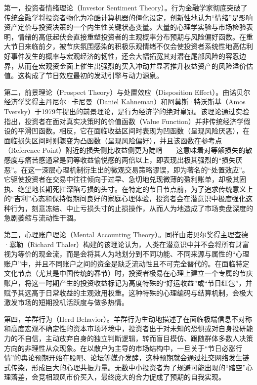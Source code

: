 \documentclass{cupb-thesis}
\begin{document}
第一，投资者情绪理论（Investor Sentiment Theory）。行为金融学家彻底突破了传统金融学将投资者物化为冷酷计算机器的僵化设定，创新性地认为“情绪”是影响资产定价与投资决策的一个内生性关键状态变量。大量的心理学实验与市场检验表明，情绪的高低起伏会直接重塑投资者的主观概率分布预期与风险偏好函数。在重大节日来临前夕，被节庆氛围感染的积极乐观情绪不仅会使投资者系统性地高估利好事件发生的概率与宏观经济的韧性，还会大幅拓宽其对潜在尾部风险的容忍边界，从而在宏观资金面上催生出强烈的买入冲动并显著推升权益资产的风险溢价估值。这构成了节日效应最初的发动引擎与动力源泉。


第二，前景理论（Prospect Theory）与处置效应（Disposition Effect）。由诺贝尔经济学奖得主丹尼尔·卡尼曼（Daniel Kahneman）和阿莫斯·特沃斯基（Amos Tversky）于1979年提出的前景理论，是行为经济学的绝对皇冠。该理论通过实验指出，投资者在面对真实决策时的价值函数（Value Function）并非传统经济学假设的平滑凹函数。相反，它在面临收益区间时表现为凹函数（呈现风险厌恶），在面临损失区间时则骤变为凸函数（呈现风险偏好），并且该函数在参考点（Reference Point）附近的损失侧比收益侧更为陡峭——这意味着对等额损失的敏感度与痛苦感通常是同等收益愉悦感的两倍以上，即表现出极其强烈的“损失厌恶”。在这一深层心理机制衍生出的微观交易策略谬误，即为著名的“处置效应”。它驱使投资者在交易中往往倾向于过早、急切地兑现微薄的盈利账单，却极其固执、绝望地长期死扛深陷亏损的头寸。在特定的节日节点前，为了追求传统意义上的“吉利”心态和保持假期间良好的家庭心理体验，投资者会在潜意识中极度强化这种行为，刻意冻结、中止亏损头寸的止损操作，从而人为地造成了市场卖盘深度的急剧萎缩与流动性干涸。


第三，心理账户理论（Mental Accounting Theory）。同样由诺贝尔奖得主理查德·塞勒（Richard Thaler）构建的该理论认为，人类在潜意识中并不会将所有财富视为等价的现金流，而是会将其人为地划分到不同功能、不同来源与属性的“心理账户”中，并且不同账户之间的资金是缺乏流动性且不可完全替代的。在面临特定文化节点（尤其是中国传统的春节）时，投资者极易在心理上建立一个专属的节庆账户，将这一时期产生的投资收益标记为高度特殊的“好运收益”或“节日红包”，并赋予其远高于日常收益的主观效用权重。这种特殊的心理编码与结算机制，会极大激发市场的短期投机活跃度与做多热情。


第四，羊群行为（Herd Behavior）。羊群行为生动地描述了在面临极端信息不对称和高度宏观不确定性的资本市场环境中，投资者出于对未知的恐惧或对自身投研能力的不自信，主动放弃自身的独立判断逻辑，转而盲目模仿、跟随群体多数人决策方向的非理性从众现象。在以散户为主导的市场结构中，一旦关于“节日必涨行情”的舆论预期开始在股吧、论坛等媒介发酵，这种预期就会通过社交网络发生链式传染，形成巨大的心理共振力量。无数中小投资者为了规避可能出现的“踏空”心理落差，会竞相跟风市价买入，最终庞大的合力促成了预期的自我实现。
\end{document}
